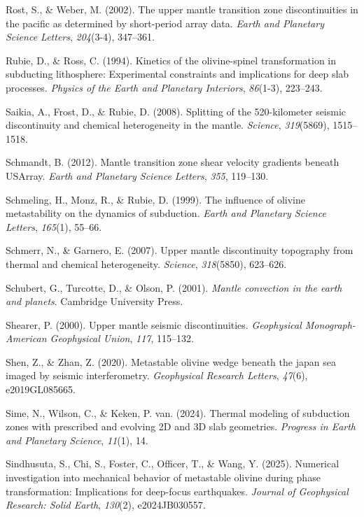 \documentclass[draft,linenumbers]{agujournal2019}
\newlength{\cslhangindent}
\newenvironment{CSLReferences}[2]
 {\begin{list}{}{
  \setlength{\itemindent}{0pt}
  \setlength{\leftmargin}{0pt}
  \setlength{\parsep}{0pt}
  \ifodd #1
   \setlength{\leftmargin}{\cslhangindent}
   \setlength{\itemindent}{-\cslhangindent}
  \fi
  \setlength{\itemsep}{#2\baselineskip}
  }
  \item\relax}
 {\end{list}}
\begin{document}
\begin{CSLReferences}{1}{0}
Rost, S., \& Weber, M. (2002). The upper mantle transition zone
discontinuities in the pacific as determined by short-period array data.
\emph{Earth and Planetary Science Letters}, \emph{204}(3-4), 347--361.

Rubie, D., \& Ross, C. (1994). Kinetics of the olivine-spinel
transformation in subducting lithosphere: Experimental constraints and
implications for deep slab processes. \emph{Physics of the Earth and
Planetary Interiors}, \emph{86}(1-3), 223--243.

Saikia, A., Frost, D., \& Rubie, D. (2008). Splitting of the
520-kilometer seismic discontinuity and chemical heterogeneity in the
mantle. \emph{Science}, \emph{319}(5869), 1515--1518.

Schmandt, B. (2012). Mantle transition zone shear velocity gradients
beneath USArray. \emph{Earth and Planetary Science Letters}, \emph{355},
119--130.

Schmeling, H., Monz, R., \& Rubie, D. (1999). The influence of olivine
metastability on the dynamics of subduction. \emph{Earth and Planetary
Science Letters}, \emph{165}(1), 55--66.

Schmerr, N., \& Garnero, E. (2007). Upper mantle discontinuity
topography from thermal and chemical heterogeneity. \emph{Science},
\emph{318}(5850), 623--626.

Schubert, G., Turcotte, D., \& Olson, P. (2001). \emph{Mantle convection
in the earth and planets}. Cambridge University Press.

Shearer, P. (2000). Upper mantle seismic discontinuities.
\emph{Geophysical Monograph-American Geophysical Union}, \emph{117},
115--132.

Shen, Z., \& Zhan, Z. (2020). Metastable olivine wedge beneath the japan
sea imaged by seismic interferometry. \emph{Geophysical Research
Letters}, \emph{47}(6), e2019GL085665.

Sime, N., Wilson, C., \& Keken, P. van. (2024). Thermal modeling of
subduction zones with prescribed and evolving 2D and 3D slab geometries.
\emph{Progress in Earth and Planetary Science}, \emph{11}(1), 14.

Sindhusuta, S., Chi, S., Foster, C., Officer, T., \& Wang, Y. (2025).
Numerical investigation into mechanical behavior of metastable olivine
during phase transformation: Implications for deep-focus earthquakes.
\emph{Journal of Geophysical Research: Solid Earth}, \emph{130}(2),
e2024JB030557.


\end{CSLReferences}
\end{document}
